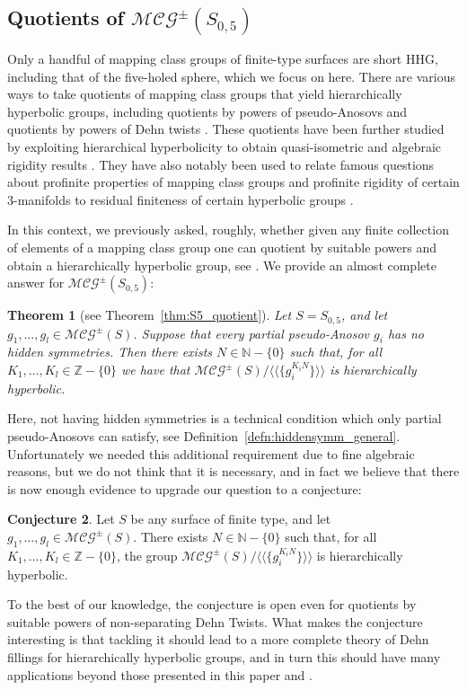 \documentclass[svgnames]{amsart}
\theoremstyle{plain}
\newtheorem{thmintro}{Theorem}
\theoremstyle{definition}
\newtheorem{conj}[thmintro]{Conjecture}
\newcommand{\MCG}{\mathcal{MCG}^\pm}
\begin{document}
\subsection*{Quotients of $\MCG(S_{0,5})$} Only a handful of mapping class  groups of finite-type surfaces are short HHG, including that of the five-holed sphere, which we focus on here. There are various ways to take quotients of mapping class groups that yield hierarchically hyperbolic groups, including quotients by powers of pseudo-Anosovs \cite{hhs_asdim} and quotients by powers of Dehn twists \cite{BHMS}. These quotients have been further studied by exploiting hierarchical hyperbolicity to obtain quasi-isometric and algebraic rigidity results \cite{rigidity_mcg_mod_dt, mangioni2023rigidityresultslargedisplacement}. They have also notably been used to relate famous questions about profinite properties of mapping class groups and profinite rigidity of certain 3-manifolds to residual finiteness of certain hyperbolic groups \cite{BHMS, Wilton}. 

In this context, we previously asked, roughly, whether given any finite collection of elements of a mapping class group one can quotient by suitable powers and obtain a hierarchically hyperbolic group, see \cite[Question 3]{rigidity_mcg_mod_dt}. We provide an almost complete answer for $\MCG(S_{0,5})$:

\begin{thmintro}[{see Theorem~\ref{thm:S5_quotient}}]\label{thmintro:mcg}
    Let $S=S_{0,5}$, and let $g_1,\dots,g_l\in \MCG(S)$. 
    Suppose that every partial pseudo-Anosov $g_i$ has no hidden symmetries. Then there exists $N\in\mathbb{N}-\{0\}$ such that, for all $K_1,\dots, K_l\in \mathbb{Z}-\{0\}$ we have that $\MCG(S)/\langle\langle \{g_i^{K_i N}\}\rangle\rangle$ is hierarchically hyperbolic.
\end{thmintro}

Here, not having hidden symmetries is a technical condition which only partial pseudo-Anosovs can satisfy, see Definition~\ref{defn:hiddensymm_general}. Unfortunately we needed this additional requirement due to fine algebraic reasons, but we do not think that it is necessary, and in fact we believe that there is now enough evidence to upgrade our question to a conjecture:

\begin{conj}
    Let $S$ be any surface of finite type, and let $g_1,\dots,g_l\in \MCG(S)$. There exists $N\in\mathbb{N}-\{0\}$ such that, for all $K_1,\dots, K_l\in \mathbb{Z}-\{0\}$, the group $\MCG(S)/\langle\langle \{g_i^{K_i N}\}\rangle\rangle$ is hierarchically hyperbolic.
\end{conj}
To the best of our knowledge, the conjecture is open even for quotients by suitable powers of non-separating Dehn Twists. What makes the conjecture interesting is that tackling it should lead to a more complete theory of Dehn fillings for hierarchically hyperbolic groups, and in turn this should have many applications beyond those presented in this paper and \cite{BHMS, Wilton}.
\end{document}
